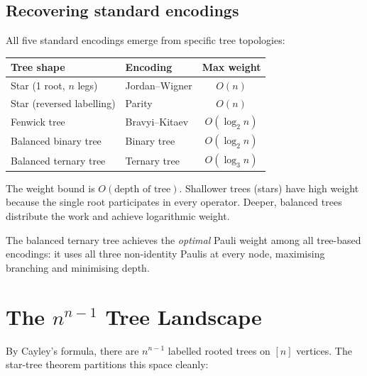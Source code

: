\documentclass[11pt,a4paper]{article}
\theoremstyle{definition}
\begin{document}
\subsection{Recovering standard encodings}

All five standard encodings emerge from specific tree topologies:

\begin{center}
\begin{tabular}{@{}llc@{}}
\toprule
Tree shape & Encoding & Max weight \\
\midrule
Star (1 root, $n$ legs) & Jordan--Wigner & $O(n)$ \\
Star (reversed labelling) & Parity & $O(n)$ \\
Fenwick tree & Bravyi--Kitaev & $O(\log_2 n)$ \\
Balanced binary tree & Binary tree & $O(\log_2 n)$ \\
Balanced ternary tree & Ternary tree & $O(\log_3 n)$ \\
\bottomrule
\end{tabular}
\end{center}

The weight bound is $O(\text{depth of tree})$.  Shallower trees (stars)
have high weight because the single root participates in every
operator.  Deeper, balanced trees distribute the work and achieve
logarithmic weight.

The balanced ternary tree achieves the \emph{optimal} Pauli weight
among all tree-based encodings: it uses all three non-identity Paulis
at every node, maximising branching and minimising depth.

\section{The $n^{n-1}$ Tree Landscape}
\label{sec:counting}

By Cayley's formula, there are $n^{n-1}$ labelled rooted trees on
$[n]$ vertices.  The star-tree theorem partitions this space cleanly:
\end{document}
